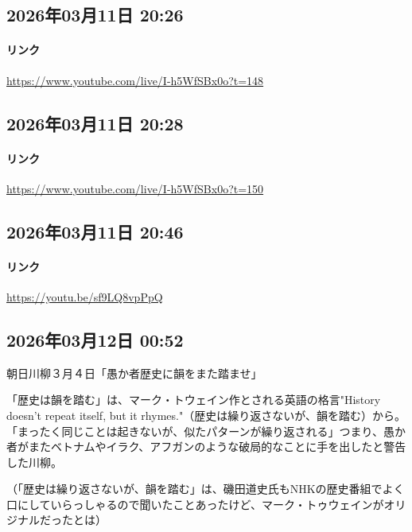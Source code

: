 \subsection*{2026年03月11日 20:26}

\paragraph{リンク}
\url{https://www.youtube.com/live/I-h5WfSBx0o?t=148}

\subsection*{2026年03月11日 20:28}

\paragraph{リンク}
\url{https://www.youtube.com/live/I-h5WfSBx0o?t=150}

\subsection*{2026年03月11日 20:46}

\paragraph{リンク}
\url{https://youtu.be/sf9LQ8vpPpQ}

\subsection*{2026年03月12日 00:52}

朝日川柳３月４日「愚か者歴史に韻をまた踏ませ」

「歴史は韻を踏む」は、マーク・トウェイン作とされる英語の格言"History doesn't repeat itself, but it rhymes."（歴史は繰り返さないが、韻を踏む）から。「まったく同じことは起きないが、似たパターンが繰り返される」つまり、愚か者がまたベトナムやイラク、アフガンのような破局的なことに手を出したと警告した川柳。

（「歴史は繰り返さないが、韻を踏む」は、磯田道史氏もNHKの歴史番組でよく口にしていらっしゃるので聞いたことあったけど、マーク・トゥウェインがオリジナルだったとは）

